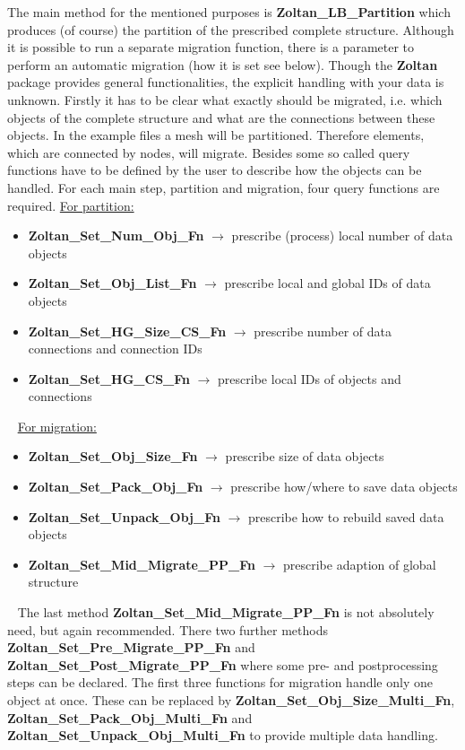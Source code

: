 \documentclass[10pt,a4paper,final,titlepage]{article}
\begin{document}
The main method for the mentioned purposes is \textbf{Zoltan\_LB\_Partition} which produces (of course) the partition of the prescribed complete structure. Although it is possible to run a separate migration function, there is a parameter to perform an automatic migration (how it is set see below). Though the \textbf{Zoltan} package provides general functionalities, the explicit handling with your data is unknown. Firstly it has to be clear what exactly should be migrated, i.e. which objects of the complete structure and what are the connections between these objects. In the example files a mesh will be partitioned. Therefore elements, which are connected by nodes, will migrate. Besides some so called query functions have to be defined by the user to describe how the objects can be handled. For each main step, partition and migration, four query functions are required.\newline
\underline{For partition:}
\begin{itemize}
\item \textbf{Zoltan\_Set\_Num\_Obj\_Fn} $\rightarrow$ prescribe (process) local number of data objects
\item \textbf{Zoltan\_Set\_Obj\_List\_Fn} $\rightarrow$ prescribe local and global IDs of data objects
\item \textbf{Zoltan\_Set\_HG\_Size\_CS\_Fn} $\rightarrow$ prescribe number of data connections and connection IDs
\item \textbf{Zoltan\_Set\_HG\_CS\_Fn} $\rightarrow$ prescribe local IDs of objects and connections
\end{itemize}
\ \newline
\underline{For migration:}
\begin{itemize}
\item \textbf{Zoltan\_Set\_Obj\_Size\_Fn} $\rightarrow$ prescribe size of data objects
\item \textbf{Zoltan\_Set\_Pack\_Obj\_Fn} $\rightarrow$ prescribe how/where to save data objects
\item \textbf{Zoltan\_Set\_Unpack\_Obj\_Fn} $\rightarrow$ prescribe how to rebuild saved data objects
\item \textbf{Zoltan\_Set\_Mid\_Migrate\_PP\_Fn} $\rightarrow$ prescribe adaption of global structure
\end{itemize}
\ \newline
The last method \textbf{Zoltan\_Set\_Mid\_Migrate\_PP\_Fn} is not absolutely need, but again recommended. There two further methods \textbf{Zoltan\_Set\_Pre\_Migrate\_PP\_Fn} and \textbf{Zoltan\_Set\_Post\_Migrate\_PP\_Fn} where some pre- and postprocessing steps can be declared. The first three functions for migration handle only one object at once. These can be replaced by \textbf{Zoltan\_Set\_Obj\_Size\_Multi\_Fn}, \textbf{Zoltan\_Set\_Pack\_Obj\_Multi\_Fn} and \textbf{Zoltan\_Set\_Unpack\_Obj\_Multi\_Fn} to provide multiple data handling.
\end{document}
